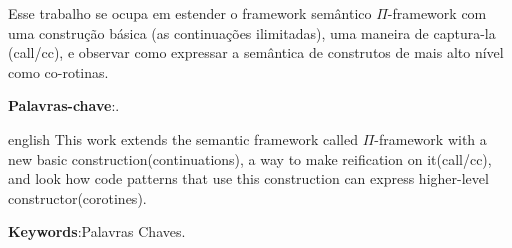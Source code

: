 
\setlength{\absparsep}{18pt} %
\begin{resumo}
Esse trabalho se ocupa em estender o framework semântico $\Pi$-framework com uma construção básica (as continuações ilimitadas), uma maneira de captura-la (call/cc), e observar como expressar a semântica de construtos de mais alto nível como co-rotinas.


 \textbf{Palavras-chave}:.
\end{resumo}

\begin{resumo}[Abstract]
 \begin{otherlanguage*}{english}
This work extends the semantic framework called $\Pi$-framework with a new basic construction(continuations), a way to make reification on it(call/cc), and look how code patterns that use this construction can express higher-level constructor(corotines).
\vspace{\onelineskip}
 
   \noindent 
   \textbf{Keywords}:Palavras Chaves.
 \end{otherlanguage*}
\end{resumo}

% 
%
%  

